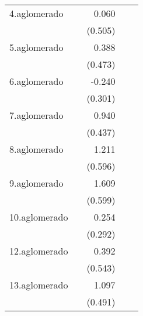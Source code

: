 {\begin{longtable}{l*{4}{D{.}{.}{-1}}}
\addlinespace
4.aglomerado&                     &       0.060         &                     &                     \\
            &                     &     (0.505)         &                     &                     \\
\addlinespace
5.aglomerado&                     &       0.388         &                     &                     \\
            &                     &     (0.473)         &                     &                     \\
\addlinespace
6.aglomerado&                     &      -0.240         &                     &                     \\
            &                     &     (0.301)         &                     &                     \\
\addlinespace
7.aglomerado&                     &       0.940\sym{*}  &                     &                     \\
            &                     &     (0.437)         &                     &                     \\
\addlinespace
8.aglomerado&                     &       1.211\sym{*}  &                     &                     \\
            &                     &     (0.596)         &                     &                     \\
\addlinespace
9.aglomerado&                     &       1.609\sym{**} &                     &                     \\
            &                     &     (0.599)         &                     &                     \\
\addlinespace
10.aglomerado&                     &       0.254         &                     &                     \\
            &                     &     (0.292)         &                     &                     \\
\addlinespace
12.aglomerado&                     &       0.392         &                     &                     \\
            &                     &     (0.543)         &                     &                     \\
\addlinespace
13.aglomerado&                     &       1.097\sym{*}  &                     &                     \\
            &                     &     (0.491)         &                     &                     \\

\end{longtable}}
